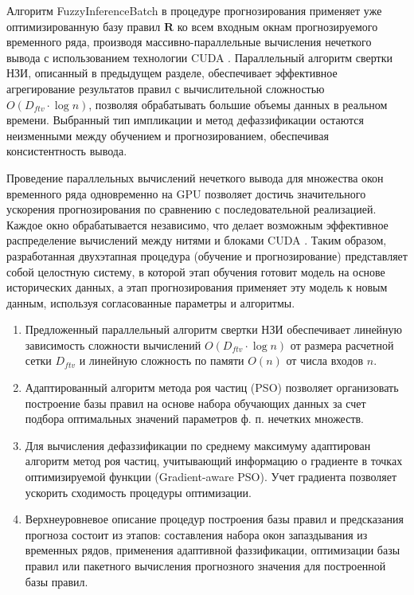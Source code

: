 Алгоритм FuzzyInferenceBatch в процедуре прогнозирования применяет уже оптимизированную базу правил $\mathbf{R}$ ко всем входным окнам прогнозируемого временного ряда, производя массивно-параллельные вычисления нечеткого вывода с использованием технологии CUDA \cite{BoreskovGPUCUDA2015,MalyavkoParallelCUDA2021,NvidiaCudaProgrammingGuide,NvidiaCudaBestPracticesGuide,NvidiaWarpPrimitives2018}. Параллельный алгоритм свертки НЗИ, описанный в предыдущем разделе, обеспечивает эффективное агрегирование результатов правил с вычислительной сложностью $O(D_{ftv} \cdot \log n)$, позволяя обрабатывать большие объемы данных в реальном времени. Выбранный тип импликации и метод дефаззификации остаются неизменными между обучением и прогнозированием, обеспечивая консистентность вывода.

Проведение параллельных вычислений нечеткого вывода для множества окон временного ряда одновременно на GPU позволяет достичь значительного ускорения прогнозирования по сравнению с последовательной реализацией. Каждое окно обрабатывается независимо, что делает возможным эффективное распределение вычислений между нитями и блоками CUDA \cite{NvidiaCudaProgrammingGuide}. Таким образом, разработанная двухэтапная процедура (обучение и прогнозирование) представляет собой целостную систему, в которой этап обучения готовит модель на основе исторических данных, а этап прогнозирования применяет эту модель к новым данным, используя согласованные параметры и алгоритмы.


\begin{enumerate}
	\item Предложенный параллельный алгоритм свертки НЗИ обеспечивает линейную зависимость сложности вычислений $O(D_{ftv}\cdot\log n)$ от размера расчетной сетки $D_{ftv}$ и линейную сложность по памяти $O(n)$ от числа входов $n$.
	\item Адаптированный алгоритм метода роя частиц (PSO) позволяет организовать построение базы правил на основе набора обучающих данных за счет подбора оптимальных значений параметров ф. п. нечетких множеств. 
	\item Для вычисления дефаззификации по среднему максимуму адаптирован алгоритм метод роя частиц, учитывающий информацию о градиенте в точках оптимизируемой функции (Gradient-aware PSO). Учет градиента позволяет ускорить сходимость процедуры оптимизации.
	\item Верхнеуровневое описание процедур построения базы правил и предсказания прогноза состоит из этапов: составления набора окон запаздывания из временных рядов, применения адаптивной фаззификации, оптимизации базы правил или пакетного вычисления прогнозного значения для построенной базы правил.
\end{enumerate}

